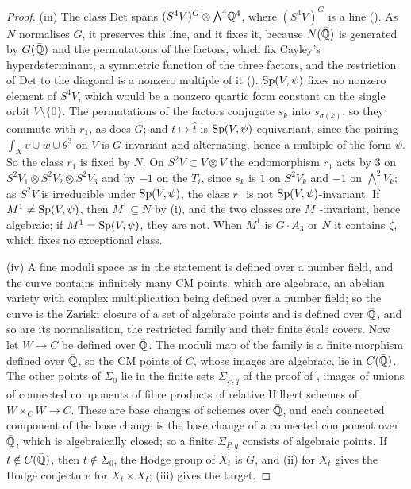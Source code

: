 \begin{proof}
(iii) The class $\mathrm{Det}$ spans $(S^{4}V)^{G}\otimes
{\textstyle\bigwedge^{4}}\mathbb{Q}^{4}$, where $(S^{4}V)^{G}$ is a line
(). As $N$ normalises $G$, it preserves this line, and it
fixes it, because $N(\bar{\mathbb{Q}})$ is generated by $G(\bar{\mathbb{Q}})$ and the
permutations of the factors, which fix Cayley's hyperdeterminant, a
symmetric function of the three factors, and the restriction of
$\mathrm{Det}$ to the diagonal is a nonzero multiple of it
(). $\operatorname{Sp}(V,\psi)$
fixes no nonzero element of $S^{4}V$, which would be a nonzero quartic form
constant on the single orbit $V\setminus\{0\}$. The permutations of the
factors conjugate $s_{k}$ into $s_{\sigma(k)}$, so they commute with $r_{1}$,
as does $G$; and $t\mapsto\hat{t}$ is $\operatorname{Sp}(V,\psi)$-equivariant, since the
pairing $\int_{X}v\cup w\cup\theta^{3}$ on $V$ is $G$-invariant and
alternating, hence a multiple of the form $\psi$. So the class $r_{1}$ is
fixed by $N$. On $S^{2}V\subset V\otimes V$ the endomorphism $r_{1}$ acts by
$3$ on $S^{2}V_{1}\otimes S^{2}V_{2}\otimes S^{2}V_{3}$ and by $-1$ on the
$T_{i}$, since $s_{k}$ is $1$ on $S^{2}V_{k}$ and $-1$ on
${\textstyle\bigwedge^{2}}V_{k}$; as $S^{2}V$ is irreducible under
$\operatorname{Sp}(V,\psi)$, the class $r_{1}$ is not $\operatorname{Sp}(V,\psi)$-invariant. If
$M^{1}\ne\operatorname{Sp}(V,\psi)$, then $M^{1}\subseteq N$ by (i), and the two classes are
$M^{1}$-invariant, hence algebraic; if $M^{1}=\operatorname{Sp}(V,\psi)$, they are not. When
$M^{1}$ is $G\cdot A_{3}$ or $N$ it contains $\zeta$, which fixes no
exceptional class.

(iv) A fine moduli space as in the statement is defined over a number field,
and the curve contains infinitely many CM points, which are algebraic, an
abelian variety with complex multiplication being defined over a number
field; so the curve is the Zariski closure of a set of algebraic points and
is defined over $\bar{\mathbb{Q}}$, and so are its normalisation, the restricted
family and their finite \'etale covers. Now let $W\to C$ be defined over
$\bar{\mathbb{Q}}$. The moduli map of the family is a finite morphism defined over
$\bar{\mathbb{Q}}$, so the CM points of $C$, whose images are algebraic, lie in
$C(\bar{\mathbb{Q}})$. The other points of $\Sigma_{0}$ lie in the finite sets
$\Sigma_{\underline{P},\underline{q}}$ of the proof of
, images of unions of connected components of fibre
products of relative Hilbert schemes of $W\times_{C}W\to C$. These are base
changes of schemes over $\bar{\mathbb{Q}}$, and each connected component of the
base change is the base change of a connected component over $\bar{\mathbb{Q}}$,
which is algebraically closed; so a finite
$\Sigma_{\underline{P},\underline{q}}$ consists of algebraic points. If
$t\notin C(\bar{\mathbb{Q}})$, then $t\notin\Sigma_{0}$, the Hodge group of $X_{t}$ is
$G$, and (ii) for $X_{t}$ gives the Hodge conjecture for $X_{t}\times X_{t}$;
(iii) gives the target.
\end{proof}

